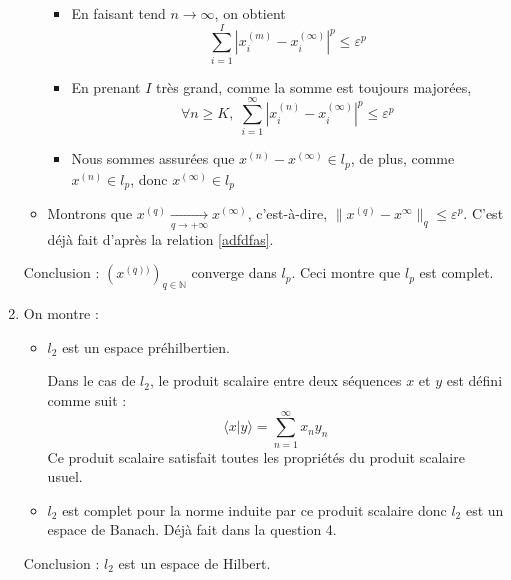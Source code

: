 \begin{solution}
\begin{enumerate}
\begin{itemize}
\begin{itemize}
                \item En faisant tend $n \to \infty$, on obtient 
                  \begin{equation}
                    \sum_{i=1}^{I} | x_i ^{(m)} - x_i ^{(\infty)}| ^{p} \le \varepsilon ^{p}
                  \end{equation}

                \item En prenant $I$ très grand, comme la somme est toujours majorées, 
                  \begin{equation}\label{adfdfas}
                    \forall n \ge K,\; \sum_{i=1}^{\infty} |x_i ^{(n)} - x_i ^{(\infty)} | ^{p} \le \varepsilon ^{p}
                  \end{equation}
                \item Nous sommes assurées que $x ^{(n)} - x ^{(\infty)} \in l _{p}$, de plus, comme $x ^{(n)} \in l _{p}$, donc $x ^{(\infty)} \in l_p$
            \end{itemize}

          \item Montrons que $x ^{(q)}  \underset{q \to +\infty}{\longrightarrow} x ^{(\infty)}$, c'est-à-dire, $\| x ^{(q)} - x ^{\infty} \|_q \le \varepsilon ^{p}$. C'est déjà fait d'après la relation \ref{adfdfas}.

            \end{itemize}

            Conclusion : $(x ^{(q))}) _{q \in \mathbb{N}}$ converge dans $l_p$. Ceci montre que $l_p$ est complet.

    \item On montre :
      \begin{itemize}

          \item $l_2$ est un espace préhilbertien. 

Dans le cas de $l_2$, le produit scalaire entre deux séquences $x$ et $y$ est défini comme suit :
\[
\langle x | y \rangle = \sum_{n=1}^{\infty} x_n y_n
\]
Ce produit scalaire satisfait toutes les propriétés du produit scalaire usuel.
\item  $l_2$ est complet pour la norme induite par ce produit scalaire donc $l_2$ est un espace de Banach. Déjà fait dans la question 4.

      \end{itemize}

      Conclusion : $l_2$ est un espace de Hilbert.


    \end{enumerate}

\end{solution}
